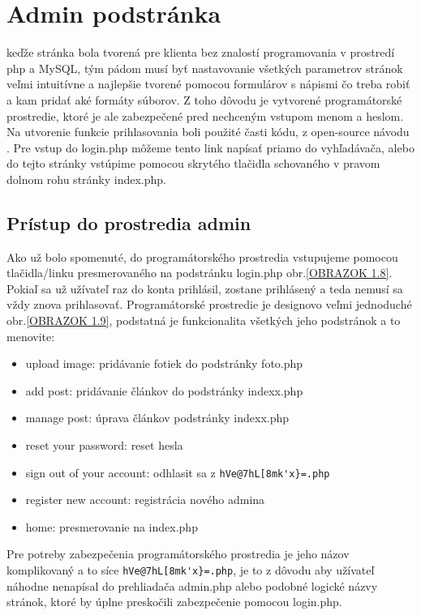 \chapter{Admin podstránka}

keďže stránka bola tvorená pre klienta bez znalostí programovania v prostredí php a MySQL, tým pádom musí byť nastavovanie všetkých parametrov stránok veľmi intuitívne a najlepšie tvorené pomocou formulárov s nápismi čo treba robiť a kam pridať aké formáty súborov. Z toho dôvodu je vytvorené programátorské prostredie, ktoré je ale zabezpečené pred nechceným vstupom menom a heslom. Na utvorenie funkcie prihlasovania boli použité časti kódu, z open-source návodu \cite{login}. Pre vstup do login.php môžeme tento link napísať priamo do vyhľadávača, alebo do tejto stránky vstúpime pomocou skrytého tlačidla schovaného v pravom dolnom rohu stránky index.php.

\section{Prístup do prostredia admin}

Ako už bolo spomenuté, do programátorského prostredia vstupujeme pomocou tlačidla/linku presmerovaného na podstránku login.php obr.\ref{OBRAZOK 1.8}. Pokiaľ sa už užívateľ raz do konta prihlásil, zostane prihlásený a teda nemusí sa vždy znova prihlasovať. Programátorské prostredie je designovo veľmi jednoduché obr.\ref{OBRAZOK 1.9}, podstatná je funkcionalita všetkých jeho podstránok a to menovite:

\begin{itemize}
\item upload image: pridávanie fotiek do podstránky foto.php
\item add post: pridávanie článkov do podstránky indexx.php
\item manage post: úprava článkov podstránky indexx.php
\item reset your password: reset hesla
\item sign out of your account: odhlasit sa z \verb|hVe@7hL[8mk'x}=.php|
\item register new account: registrácia nového admina
\item home: presmerovanie na index.php
\end{itemize}

Pre potreby zabezpečenia programátorského prostredia je jeho názov komplikovaný a to síce \verb|hVe@7hL[8mk'x}=.php|, je to z dôvodu aby užívateľ náhodne nenapísal do prehliadača admin.php alebo podobné logické názvy stránok, ktoré by úplne preskočili zabezpečenie pomocou login.php.


